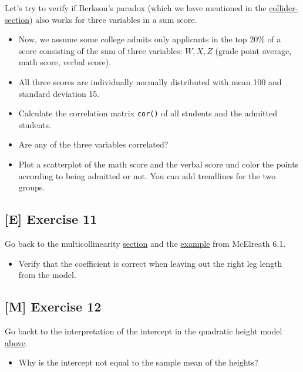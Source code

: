 \documentclass[
]{book}
\providecommand{\tightlist}{%
  \setlength{\itemsep}{0pt}\setlength{\parskip}{0pt}}
\begin{document}
Let's try to verify if Berkson's paradox (which we have mentioned in the
\hyperref[collider]{collider-section}) also works for three variables in a sum score.

\begin{itemize}
\tightlist
\item
  Now, we assume some college admits only applicants in the top 20\% of a score
  consisting of the sum of three variables: \(W, X, Z\) (grade point average, math score, verbal score).
\item
  All three scores are individually normally distributed with mean 100 and standard deviation 15.
\item
  Calculate the correlation matrix \texttt{cor()} of all students and the admitted students.
\item
  Are any of the three variables correlated?
\item
  Plot a scatterplot of the math score and the verbal score und color the points according
  to being admitted or not. You can add trendlines for the two groups.
\end{itemize}

\subsection{{[}E{]} Exercise 11}\label{exercise11_multiple_regression}

Go back to the multicollinearity \hyperref[multicollinearity]{section} and the \hyperref[mcElreath_6.1]{example}
from McElreath 6.1.

\begin{itemize}
\tightlist
\item
  Verify that the coefficient is correct when leaving out the right leg length from the model.
\end{itemize}

\subsection{{[}M{]} Exercise 12}\label{exercise12_multiple_regression}

Go backt to the interpretation of the intercept in the quadratic height model \hyperref[interpretation_output_freq_quadratic]{above}.

\begin{itemize}
\tightlist
\item
  Why is the intercept not equal to the sample mean of the heights?
\end{itemize}
\end{document}
